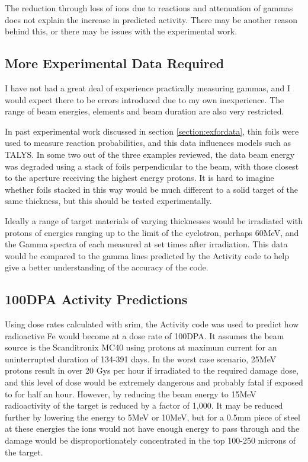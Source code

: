 The reduction through loss of ions due to reactions and attenuation of gammas does not explain the increase in predicted activity.  There may be another reason behind this, or there may be issues with the experimental work.


\subsection{More Experimental Data Required}

I have not had a great deal of experience practically measuring gammas, and I would expect there to be errors introduced due to my own inexperience.  The range of beam energies, elements and beam duration are also very restricted.

In past experimental work discussed in section \ref{section:exfordata}, thin foils were used to measure reaction probabilities, and this data influences models such as TALYS.  In some two out of the three examples reviewed, the data beam energy was degraded using a stack of foils perpendicular to the beam, with those closest to the aperture receiving the highest energy protons.  It is hard to imagine whether foils stacked in this way would be much different to a solid target of the same thickness, but this should be tested experimentally.

Ideally a range of target materials of varying thicknesses would be irradiated with protons of energies ranging up to the limit of the cyclotron, perhaps 60MeV, and the Gamma spectra of each measured at set times after irradiation.  This data would be compared to the gamma lines predicted by the Activity code to help give a better understanding of the accuracy of the code.



\subsection{100DPA Activity Predictions}

Using dose rates calculated with \acrshort{srim}, the Activity code was used to predict how radioactive Fe would become at a dose rate of 100DPA.  It assumes the beam source is the Scanditronix MC40 using protons at maximum current for an uninterrupted duration of 134-391 days.  In the worst case scenario, 25MeV protons result in over 20 Gys per hour if irradiated to the required damage dose, and this level of dose would be extremely dangerous and probably fatal if exposed to for half an hour.  However, by reducing the beam energy to 15MeV radioactivity of the target is reduced by a factor of 1,000.  It may be reduced further by lowering the energy to 5MeV or 10MeV, but for a 0.5mm piece of steel at these energies the ions would not have enough energy to pass through and the damage would be disproportionately concentrated in the top 100-250 microns of the target.

